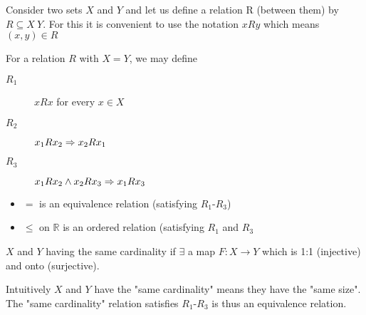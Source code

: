 


Consider two sets $X$ and $Y$ and let us define a relation R (between them) by $R \subseteq X \ Y$. For this it is convenient to use the notation $xRy$ which means $(x,y)\in R$

\begin{mydef}
For a relation $R$ with $X=Y$, we may define
\begin{description}
  	\item[$R_1$]  $xRx$ for every $x\in X$
    \item[$R_2$]  $x_1Rx_2\Rightarrow x_2Rx_1 $
	\item[$R_3$]   $x_1Rx_2 \land x_2Rx_3 \Rightarrow x_1Rx_3$
\end{description}
\end{mydef}

\begin{example}
\begin{minipage}{5in}
\begin{itemize}
\item $=$ is an equivalence relation (satisfying $R_1$-$R_3$)
\item $\leq$ on $\mathbb{R}$ is an ordered relation (satisfying $R_1$ and $R_3$
\end{itemize}
\end{minipage}
\end{example}

\begin{mydef} $X$ and $Y$ having the same cardinality if $\exists$ a map $F: X\to Y$ which is 1:1 (injective) and onto (surjective).
\end{mydef}

Intuitively $X$ and $Y$ have the "same cardinality" means they have the "same size".
The "same cardinality" relation satisfies $R_1$-$R_3$ is thus an equivalence relation. 

